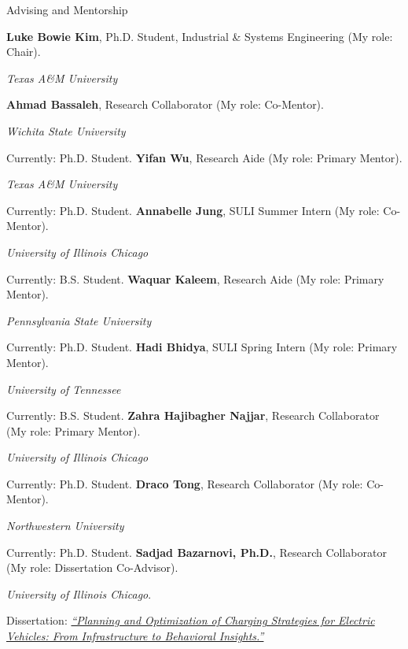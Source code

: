 \begin{rubric}{Advising and Mentorship}

\entry*[2026 -- Present]%
\textbf{Luke Bowie Kim}, Ph.D. Student, Industrial \& Systems Engineering (My role: Chair). \par
\textit{Texas A\&M University}
\vspace{5pt}


\entry*[2026 -- Present] \textbf{Ahmad Bassaleh}, Research Collaborator (My role: Co-Mentor). \par
\textit{Wichita State University} \par
Currently: Ph.D. Student.
\entry*[2026] \textbf{Yifan Wu}, Research Aide (My role: Primary Mentor). \par
\textit{Texas A\&M University} \par
Currently: Ph.D. Student.
\entry*[2026] \textbf{Annabelle Jung}, SULI Summer Intern (My role: Co-Mentor). \par
\textit{University of Illinois Chicago} \par
Currently: B.S. Student.
\entry*[2026] \textbf{Waquar Kaleem}, Research Aide (My role: Primary Mentor). \par
\textit{Pennsylvania State University} \par
Currently: Ph.D. Student.
\entry*[2026] \textbf{Hadi Bhidya}, SULI Spring Intern (My role: Primary Mentor). \par
\textit{University of Tennessee} \par
Currently: B.S. Student.
\entry*[2025 -- Present] \textbf{Zahra Hajibagher Najjar}, Research Collaborator (My role: Primary Mentor). \par
\textit{University of Illinois Chicago} \par
Currently: Ph.D. Student.
\entry*[2024 -- 2025] \textbf{Draco Tong}, Research Collaborator (My role: Co-Mentor). \par
\textit{Northwestern University} \par
Currently: Ph.D. Student.
\entry*[2024 -- 2025] \textbf{Sadjad Bazarnovi, Ph.D.}, Research Collaborator (My role: Dissertation Co-Advisor). \par
\textit{University of Illinois Chicago}. \par
Dissertation: \href{https://indigo.uic.edu/articles/thesis/Planning_and_Optimization_of_Charging_Strategies_for_Electric_Vehicles_From_Infrastructure_to_Behavioral/31451047?file=62324233}{\emph{``Planning and Optimization of Charging Strategies for Electric Vehicles: From Infrastructure to Behavioral Insights.''}} \par

\end{rubric}
